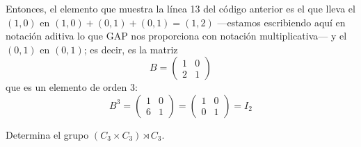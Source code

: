 \documentclass[a4paper, 11pt]{article}
\begin{document}
  Entonces, el elemento que muestra la línea 13 del código anterior es el que lleva el $(1,0)$ en $(1,0)+(0,1)+(0,1) = (1,2)$ ---estamos escribiendo aquí en notación aditiva lo que GAP nos proporciona con notación multiplicativa--- y el $(0,1)$ en $(0,1)$; es decir, es la matriz
  \[
  B = \left(
  \begin{array}{cc}
      1 & 0 \\
      2 & 1
  \end{array}
  \right)
  \]
  que es un elemento de orden 3:
  \[
  B^3 = \left(
  \begin{array}{cc}
      1 & 0 \\
      6 & 1
  \end{array}
  \right) =
  \left(
  \begin{array}{cc}
      1 & 0 \\
      0 & 1
  \end{array}
  \right) = I_2
  \]

  \begin{apartado}
      Determina el grupo  $(C_3 \times C_3) \rtimes C_3$.
  \end{apartado}
\end{document}
